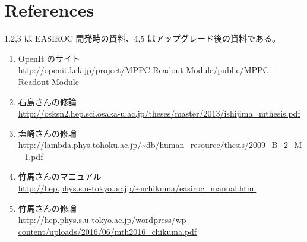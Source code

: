 

\section{References}
1,2,3 は EASIROC 開発時の資料、4,5 はアップグレード後の資料である。
\begin{enumerate}
\item OpenIt のサイト\\
\url{http://openit.kek.jp/project/MPPC-Readout-Module/public/MPPC-Readout-Module}
\item 石島さんの修論\\
\url{http://osksn2.hep.sci.osaka-u.ac.jp/theses/master/2013/ishijima_mthesis.pdf}
\item 塩崎さんの修論\\
\url{http://lambda.phys.tohoku.ac.jp/~db/human_resource/thesis/2009_B_2_M_1.pdf}
\item 竹馬さんのマニュアル\\
\url{http://hep.phys.s.u-tokyo.ac.jp/~nchikuma/easiroc_manual.html} 
\item 竹馬さんの修論\\
\url{http://hep.phys.s.u-tokyo.ac.jp/wordpress/wp-content/uploads/2016/06/mth2016_chikuma.pdf}
\end{enumerate}





